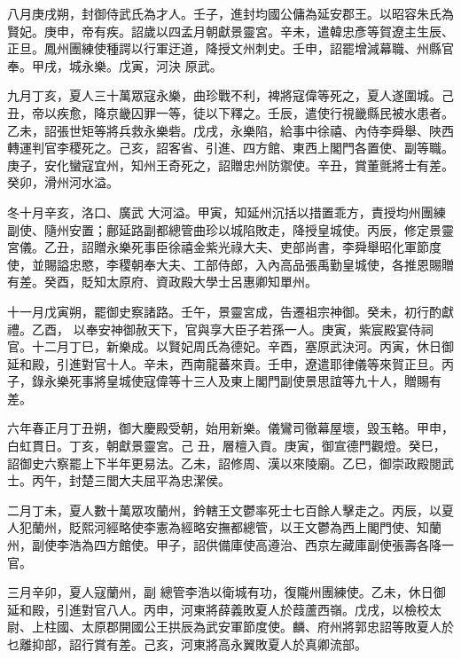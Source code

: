 \begin{pinyinscope}
 八月庚戌朔，封御侍武氏為才人。壬子，進封均國公傭為延安郡王。以昭容朱氏為賢妃。庚申，帝有疾。詔歲以四孟月朝獻景靈宮。辛未，遣韓忠彥等賀遼主生辰、正旦。鳳州團練使種諤以行軍迂道，降授文州刺史。壬申，詔罷增減幕職、州縣官奉。甲戌，城永樂。戊寅，河決
 原武。



 九月丁亥，夏人三十萬眾寇永樂，曲珍戰不利，裨將寇偉等死之，夏人遂圍城。己丑，帝以疾愈，降京畿囚罪一等，徒以下釋之。壬辰，遣使行視畿縣民被水患者。乙未，詔張世矩等將兵救永樂砦。戊戌，永樂陷，給事中徐禧、內侍李舜舉、陜西轉運判官李稷死之。己亥，詔客省、引進、四方館、東西上閣門各置使、副等職。庚子，安化蠻寇宜州，知州王奇死之，詔贈忠州防禦使。辛丑，賞董氈將士有差。癸卯，滑州河水溢。



 冬十月辛亥，洛口、廣武
 大河溢。甲寅，知延州沉括以措置乖方，責授均州團練副使、隨州安置；鄜延路副都總管曲珍以城陷敗走，降授皇城使。丙辰，修定景靈宮儀。乙丑，詔贈永樂死事臣徐禧金紫光祿大夫、吏部尚書，李舜舉昭化軍節度使，並賜謚忠愍，李稷朝奉大夫、工部侍郎，入內高品張禹勤皇城使，各推恩賜贈有差。癸酉，貶知太原府、資政殿大學士呂惠卿知單州。



 十一月戊寅朔，罷御史察諸路。壬午，景靈宮成，告遷祖宗神御。癸未，初行酌獻禮。乙酉，
 以奉安神御赦天下，官與享大臣子若孫一人。庚寅，紫宸殿宴侍祠官。十二月丁巳，新樂成。以賢妃周氏為德妃。辛酉，塞原武決河。丙寅，休日御延和殿，引進對官十人。辛未，西南龍蕃來貢。壬申，遼遣耶律儀等來賀正旦。丙子，錄永樂死事將皇城使寇偉等十三人及東上閣門副使景思誼等九十人，贈賜有差。



 六年春正月丁丑朔，御大慶殿受朝，始用新樂。儀鸞司徹幕屋壞，毀玉輅。甲申，白虹貫日。丁亥，朝獻景靈宮。己
 丑，層檀入貢。庚寅，御宣德門觀燈。癸巳，詔御史六察罷上下半年更易法。乙未，詔修周、漢以來陵廟。乙巳，御崇政殿閱武士。丙午，封楚三閭大夫屈平為忠潔侯。



 二月丁未，夏人數十萬眾攻蘭州，鈐轄王文鬱率死士七百餘人擊走之。丙辰，以夏人犯蘭州，貶熙河經略使李憲為經略安撫都總管，以王文鬱為西上閣門使、知蘭州，副使李浩為四方館使。甲子，詔供備庫使高遵治、西京左藏庫副使張壽各降一官。



 三月辛卯，夏人寇蘭州，副
 總管李浩以衛城有功，復隴州團練使。乙未，休日御延和殿，引進對官八人。丙申，河東將薛義敗夏人於葭蘆西嶺。戊戌，以檢校太尉、上柱國、太原郡開國公王拱辰為武安軍節度使。麟、府州將郭忠詔等敗夏人於乜離抑部，詔行賞有差。己亥，河東將高永翼敗夏人於真卿流部。




\end{pinyinscope}
